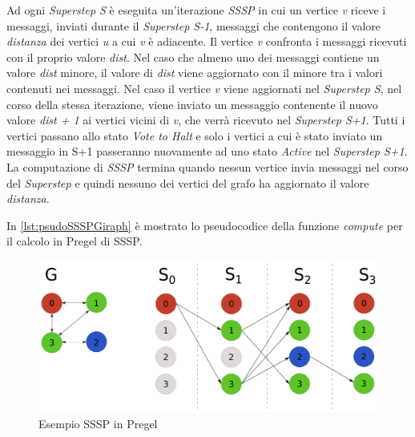 \documentclass[LaM,binding=0.6cm]{sapthesis}
\begin{document}
Ad ogni \textit{Superstep S} è eseguita un'iterazione \textit{SSSP} in cui un vertice \textit{v} riceve i messaggi, inviati durante il \textit{Superstep S-1}, messaggi che contengono il valore \textit{distanza} dei vertici \textit{u} a cui \textit{v} è adiacente.
Il vertice \textit{v} confronta i messaggi ricevuti con il proprio valore \textit{dist}. Nel caso che almeno uno dei messaggi contiene un valore \textit{dist} minore, il valore di \textit{dist} viene aggiornato con il minore tra i valori contenuti nei messaggi.
Nel caso il vertice \textit{v} viene aggiornati nel \textit{Superstep S}, nel corso della stessa iterazione, viene inviato un messaggio contenente il nuovo valore \textit{dist + 1} ai vertici vicini di \textit{v}, che verrà ricevuto nel \textit{Superstep S+1}. Tutti i vertici passano allo stato \textit{Vote to Halt} e solo i vertici a cui è stato inviato un messaggio in S+1 passeranno nuovamente ad uno stato \textit{Active} nel  \textit{Superstep S+1}.
La computazione di \textit{SSSP} termina quando nessun vertice invia messaggi nel corso del \textit{Superstep} e quindi nessuno dei vertici del grafo ha aggiornato il valore \textit{distanza}.

In \ref{lst:psudoSSSPGiraph} è mostrato lo pseudocodice della funzione \textit{compute} per il calcolo in Pregel di SSSP.



\begin{figure}
\centering
\includegraphics[width=1\textwidth]{PREGEL-SSSP}
\caption{Esempio SSSP in Pregel}
\label{fig:PREGELSSSP}
\end{figure}


\begin{minipage}{\linewidth}
	
\end{minipage}
\end{document}
